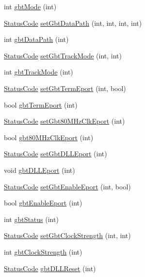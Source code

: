 \begin{DoxyCompactItemize}
\item 
int \hyperlink{classFEB__v1_aab7166214ef0f99f4835ce9a7416e052}{gbtMode} (int)
\item 
\hyperlink{classStatusCode}{StatusCode} \hyperlink{classFEB__v1_aabd651b11d1119ce3a19b7fb083cca78}{setGbtDataPath} (int, int, int, int)
\item 
int \hyperlink{classFEB__v1_adf46e43506d1bd7cd26ca62c685e6c98}{gbtDataPath} (int)
\item 
\hyperlink{classStatusCode}{StatusCode} \hyperlink{classFEB__v1_ab65b869df2adc4d3880caad71a4e3074}{setGbtTrackMode} (int, int)
\item 
int \hyperlink{classFEB__v1_a25eeb132e9058cd421a085878fba9204}{gbtTrackMode} (int)
\item 
\hyperlink{classStatusCode}{StatusCode} \hyperlink{classFEB__v1_ab7c261039c872c9f039fb7366a84d271}{setGbtTermEport} (int, bool)
\item 
bool \hyperlink{classFEB__v1_a84fa302a012eee663fe21829866fb20e}{gbtTermEport} (int)
\item 
\hyperlink{classStatusCode}{StatusCode} \hyperlink{classFEB__v1_a6efa59ad9f80ae40aad2df0b925b0b14}{setGbt80MHzClkEport} (int)
\item 
bool \hyperlink{classFEB__v1_ac22b1ffdc20be66330a66ebd12cd13f1}{gbt80MHzClkEport} (int)
\item 
\hyperlink{classStatusCode}{StatusCode} \hyperlink{classFEB__v1_a66584fe850cdf9e4ccd03fd4b2f4db38}{setGbtDLLEport} (int)
\item 
void \hyperlink{classFEB__v1_add5e12a5351c0c4986d24f433155351b}{gbtDLLEport} (int)
\item 
\hyperlink{classStatusCode}{StatusCode} \hyperlink{classFEB__v1_a30ce0e679748a4e2bf7f953b2162618f}{setGbtEnableEport} (int, bool)
\item 
bool \hyperlink{classFEB__v1_ae11c18013b56bdbb947e9ae147d6d77d}{gbtEnableEport} (int)
\item 
int \hyperlink{classFEB__v1_a7b47a1b2c7af459b211eed59f4dbe9a7}{gbtStatus} (int)
\item 
\hyperlink{classStatusCode}{StatusCode} \hyperlink{classFEB__v1_a717d56186e6221cb20397cc3e496da50}{setGbtClockStrength} (int, int)
\item 
int \hyperlink{classFEB__v1_a6ca15de02d32e38a0fc90ad29302072e}{gbtClockStrength} (int)
\item 
\hyperlink{classStatusCode}{StatusCode} \hyperlink{classFEB__v1_a79b299ce9b36b51916103371aef027df}{gbtDLLReset} (int)
\item 

\end{DoxyCompactItemize}
